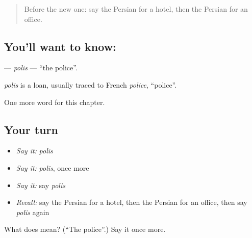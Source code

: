 \label{lesson:FA-C71-polis}



\begin{quote}
Before the new one: say the Persian for a hotel, then the Persian for an office.
\end{quote}

\subsection*{You'll want to know: }
\textbf{} — \emph{polis} — \textquotedblleft{}the police\textquotedblright{}.

\begin{cousinweb}
\emph{polis} is a loan, usually traced to French \emph{police}, \textquotedblleft{}police\textquotedblright{}.
\end{cousinweb}

\begin{grammarlens}[title={What you've built}]
One more word for this chapter.
\end{grammarlens}

\subsection*{Your turn}
\begin{itemize}
\raggedright
  \item \emph{Say it:} \emph{polis}
  \item \emph{Say it:} \emph{polis}, once more
  \item \emph{Say it:} say \emph{polis}
  \item \emph{Recall:} say the Persian for a hotel, then the Persian for an office, then say \emph{polis} again
\end{itemize}

\begin{tcolorbox}[breakable,colback=teal!4,colframe=teal!35!black,title={Before you move on}]
What does  mean? (\textquotedblleft{}The police\textquotedblright{}.) Say it once more.
\end{tcolorbox}
